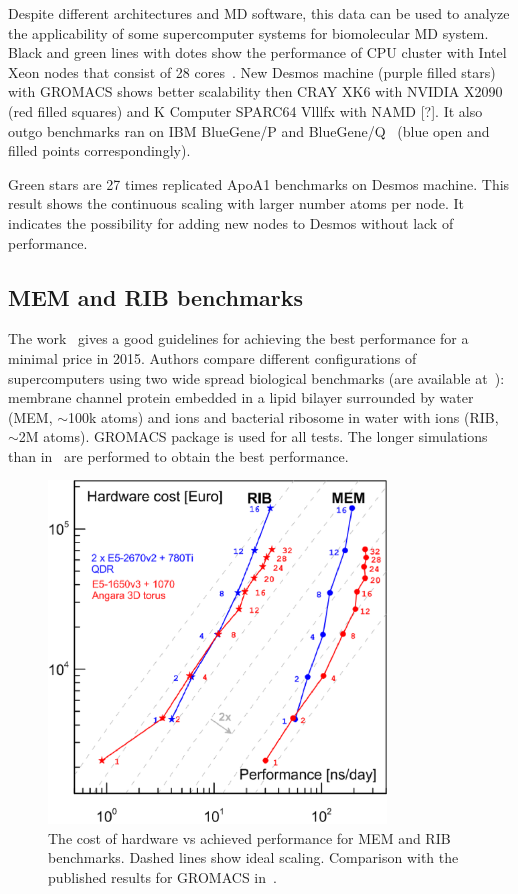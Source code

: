 \documentclass{llncs}
\begin{document}
Despite different architectures and MD software, this data can be used to analyze the applicability of some supercomputer systems for biomolecular MD system. Black and green lines with dotes show the performance of CPU cluster with Intel Xeon nodes that consist of 28 cores~\cite{Smirnov2016}. New Desmos machine (purple filled stars) with GROMACS shows better scalability then CRAY XK6 with NVIDIA X2090~\cite{Sun2012} (red filled squares) and K Computer SPARC64 Vlllfx with NAMD [?]. It also outgo benchmarks ran on IBM BlueGene/P and BlueGene/Q~\cite{Kumar2013} (blue open and filled points correspondingly). 

Green stars are 27 times replicated ApoA1 benchmarks on Desmos machine. This result shows the continuous scaling with larger number atoms per node. It indicates the possibility for adding new nodes to Desmos without lack of performance.

\subsection{MEM and RIB benchmarks}

The work~\cite{Kutzner2015} gives a good guidelines for achieving the best performance for a minimal price in 2015. Authors compare different configurations of supercomputers using two wide spread biological benchmarks (are available at~\cite{bench}): membrane channel protein embedded in a lipid bilayer surrounded by water (MEM, $\sim $100k atoms) and ions and bacterial ribosome in water with ions (RIB, $\sim$2M atoms). GROMACS package is used for all tests. The longer simulations than in~\cite{Kutzner2015} are performed to obtain the best performance.

\begin{figure}[h]
\centering
\includegraphics[width=0.8\textwidth]{img/best_bang.eps}
\caption{\label{BestBang}The cost of hardware vs achieved performance for MEM and RIB benchmarks. Dashed lines show ideal scaling. Comparison with the published results for GROMACS in~\cite{Kutzner2015}.}
\end{figure}
\end{document}
